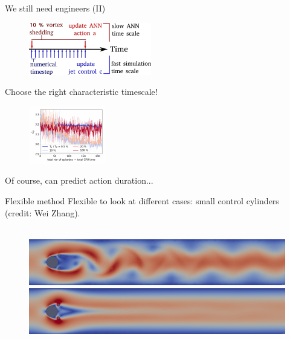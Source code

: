 \documentclass{beamer}
\begin{document}
\begin{frame}{We still need engineers (II)}
    \begin{figure}
    \begin{center}
      \includegraphics[width=.45\textwidth]{Figures/fig2_illustration_2_time_scales}
    \end{center}
    \end{figure}

    Choose the right characteristic timescale!

    \begin{figure}
    \begin{center}
      \includegraphics[width=.40\textwidth]{Figures/fig6_fig_effect_action_frq}
    \end{center}
    \end{figure}

    Of course, can predict action duration...
\end{frame}



\begin{frame}{Flexible method}
Flexible to look at different cases: small control cylinders \\ (credit: Wei Zhang). \\~\\

    \begin{figure}
    \begin{center}
      \includegraphics[width=.99\textwidth]{Figures/FlowUncontrolled} \\
      \includegraphics[width=.99\textwidth]{Figures/FlowControlled}
    \end{center}
    \end{figure}
\end{frame}
\end{document}
